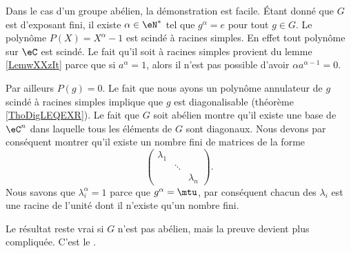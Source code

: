 Dans le cas d'un groupe abélien, la démonstration est facile. Étant donné que \( G\) est d'exposant fini, il existe \( \alpha\in \eN^*\) tel que \( g^{\alpha}=e\) pour tout \( g\in G\). Le polynôme \( P(X)=X^{\alpha}-1\) est scindé à racines simples. En effet tout polynôme sur \( \eC\) est scindé. Le fait qu'il soit à racines simples provient du lemme \ref{LemwXXzIt} parce que si \( a^{\alpha}=1\), alors il n'est pas possible d'avoir \( \alpha a^{\alpha-1}=0\).

Par ailleurs \( P(g)=0\). Le fait que nous ayons un polynôme annulateur de \( g\) scindé à racines simples implique que \( g\) est diagonalisable (théorème \ref{ThoDigLEQEXR}). Le fait que \( G\) soit abélien montre qu'il existe une base de \( \eC^n\) dans laquelle tous les éléments de \( G\) sont diagonaux. Nous devons par conséquent montrer qu'il existe un nombre fini de matrices de la forme
\begin{equation}
    \begin{pmatrix}
        \lambda_1    &       &       \\
            &   \ddots    &       \\
            &       &   \lambda_n
    \end{pmatrix}.
\end{equation}
Nous savons que \( \lambda_i^{\alpha}=1\) parce que \( g^{\alpha}=\mtu\), par conséquent chacun des \( \lambda_i\) est une racine de l'unité dont il n'existe qu'un nombre fini.

Le résultat reste vrai si \( G\) n'est pas abélien, mais la preuve devient plus compliquée. C'est le .
